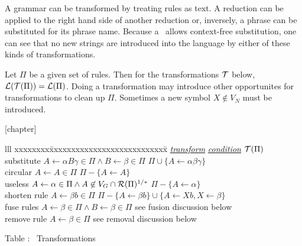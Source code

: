 \begin{enumerate}
\noindent A grammar can be transformed by treating rules as text.  
A reduction can be applied to the right hand side of another reduction or, 
inversely, a phrase can be substituted for its phrase name.
Because a \cfg\ allows context-free substitution, 
one can see that no new strings are introduced into the language 
by either of these kinds of transformations. 

Let $\Pi$ be a given set of rules. 
Then for the transformations $\cal T$ below, 
${\cal L}({\cal T}(\Pi)) ={\cal L}(\Pi)$.  
Doing a transformation may introduce other opportunites 
for transformations to clean up $\Pi$.  
Sometimes a new symbol $X \not\in V_N$ must be introduced.

\vspace{1em}

{}[chapter]
\setcounter{GrammarTx}{\value{table}}

\begin{samepage}
\begin{tabbing}{lll}
xxxxxxxx\=xxxxxxxxxxxxxxxxxxxxxxxxxxx\=\kill
\underline{\em transform}
  \>\quad\underline{\em condition} 
  \>\quad\underline{${\cal T}(\Pi)$}                       \\
substitute
  \> $A\leftarrow\alpha B\gamma \in \Pi \wedge B \leftarrow\beta \in \Pi$
  \> $\Pi \cup \{A\leftarrow\alpha\beta\gamma\}$          \\
circular
  \> $A\leftarrow A \in \Pi$
  \> $\Pi - \{ A\leftarrow A \}$                         \\
useless
  \> $A\leftarrow \alpha \in \Pi \wedge  
     A \not\in V_G \cap {\cal R}(\Pi)^{1/*}$
  \> $\Pi - \{ A\leftarrow \alpha \}$                    \\
shorten rule
  \> $A\leftarrow\beta b \in \Pi$
  \> $\Pi -\{A\leftarrow\beta b\} \cup 
           \{A\leftarrow X b, X\leftarrow \beta\}$       \\
fuse rules
  \> $A\leftarrow\beta \in \Pi \wedge 
      B\leftarrow\beta \in \Pi$
  \> see fusion discussion below                         \\
remove rule
  \> $A\leftarrow \beta \in \Pi$
  \> see removal discussion below
\end{tabbing}
\end{samepage}

\begin{center}
Table \thetable:  \cfg\ Transformations
\end{center}


\end{enumerate}

